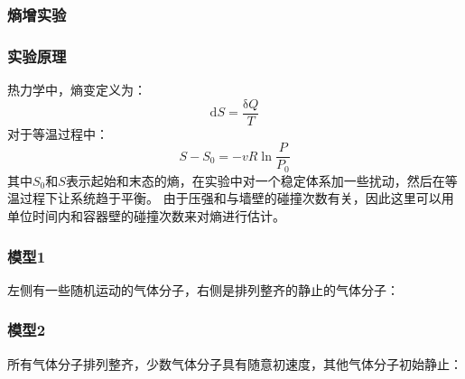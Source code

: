 ﻿\documentclass{article}
\begin{document}
	\subsubsection{熵增实验}
	\subsubsection*{实验原理}
	热力学中，熵变定义为：
	\[\mathrm{d}S = \frac{\mathrm{\delta}Q}{T}\]
	对于等温过程中：
	\[S - S_0 = -vR\ln\frac{P}{P_0}\]
	其中$S_0$和$S$表示起始和末态的熵，在实验中对一个稳定体系加一些扰动，然后在等温过程下让系统趋于平衡。
	由于压强和与墙壁的碰撞次数有关，因此这里可以用单位时间内和容器壁的碰撞次数来对熵进行估计。
	\subsubsection*{模型1}
	左侧有一些随机运动的气体分子，右侧是排列整齐的静止的气体分子：
	\begin{figure}[H]
	\end{figure}
	\subsubsection*{模型2}
	所有气体分子排列整齐，少数气体分子具有随意初速度，其他气体分子初始静止：
	\begin{figure}[H]
	\end{figure}
\end{document}
